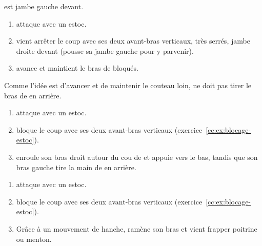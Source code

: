 \begin{exercice}
\label{cc:ex:blocage-estoc}

\D est jambe gauche devant.

\begin{enumerate}
	\item \A attaque \D avec un estoc.
	
	\item \D vient arrêter le coup avec ses deux avant-bras verticaux, très serrés, jambe droite devant (\D pousse sa jambe gauche pour y parvenir).
	
	\item \D avance et maintient le bras de \A bloqués.
\end{enumerate}

Comme l'idée est d'avancer et de maintenir le couteau loin, \D ne doit pas tirer le bras de \A en arrière.

\end{exercice}


\begin{technique}

\begin{enumerate}
	\item \A attaque \D avec un estoc.
	
	\item \D bloque le coup avec ses deux avant-bras verticaux (exercice~\ref{cc:ex:blocage-estoc}).
	
	\item \D enroule son bras droit autour du cou de \A et appuie vers le bas, tandis que son bras gauche tire la main de \A en arrière.
\end{enumerate}

\end{technique}


\begin{technique}

\begin{enumerate}
	\item \A attaque \D avec un estoc.
	
	\item \D bloque le coup avec ses deux avant-bras verticaux (exercice~\ref{cc:ex:blocage-estoc}).
	
	\item Grâce à un mouvement de hanche, \D ramène son bras et vient frapper poitrine ou menton.
\end{enumerate}

\end{technique}


